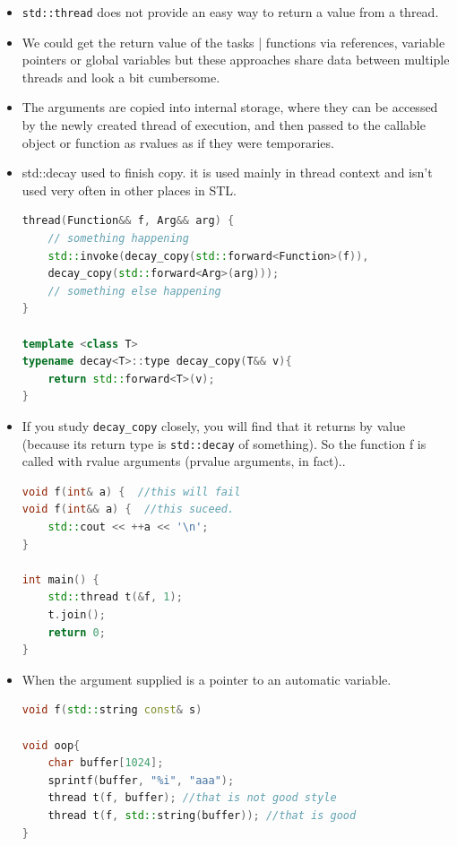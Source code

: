 \documentclass[a4paper,11pt,twoside]{book}
\begin{document}
\begin{itemize}
	\item \texttt{std::thread} does not provide an easy way to return a value from a thread.
	
	\item We could get the return value of the tasks | functions via references, variable pointers or global variables but these approaches share data between multiple threads and look a bit cumbersome.
	
	\item The arguments are copied into internal storage, where they can be accessed by the newly created thread of execution, and then passed to the callable object or function as rvalues as if they were temporaries.
	
	\item std::decay used to finish copy. it is used mainly in thread context and isn't used very often in other places in STL.
\begin{lstlisting}[frame=single, language=c++]
thread(Function&& f, Arg&& arg) {
	// something happening
	std::invoke(decay_copy(std::forward<Function>(f)),
	decay_copy(std::forward<Arg>(arg)));
	// something else happening
}
	
template <class T> 
typename decay<T>::type decay_copy(T&& v){
	return std::forward<T>(v); 
}
\end{lstlisting}

	\item  If you study \texttt{decay\_copy} closely, you will find that it returns by value (because its return type is \texttt{std::decay} of something). So the function f is called with rvalue arguments (prvalue arguments, in fact)..
\begin{lstlisting}[frame=single, language=c++]
void f(int& a) {  //this will fail
void f(int&& a) {  //this suceed.
	std::cout << ++a << '\n';
}

int main() {
	std::thread t(&f, 1);
	t.join();
	return 0;
}
\end{lstlisting}

	\item When the argument supplied is a pointer to an automatic variable.
\begin{lstlisting}[frame=single, language=c++]
void f(std::string const& s)
	
void oop{
	char buffer[1024];
	sprintf(buffer, "%i", "aaa");
	thread t(f, buffer); //that is not good style
	thread t(f, std::string(buffer)); //that is good
}
\end{lstlisting}	


\end{itemize}
\end{document}
